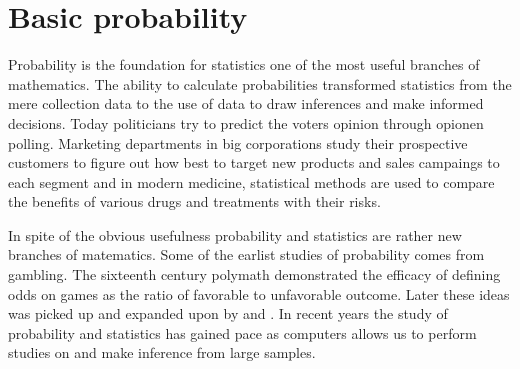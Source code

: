 \chapter{Basic probability}

Probability is the foundation for statistics one of the most useful branches of mathematics. The ability to calculate probabilities transformed statistics from the mere collection data to the use of data to draw inferences and make informed decisions. Today politicians try to predict the voters opinion through opionen polling. Marketing departments in big corporations study their prospective customers to figure out how best to target new products and sales campaings to each segment and in modern medicine, statistical methods are used to compare the benefits of various drugs and treatments with their risks.

\myindent In spite of the obvious usefulness probability and statistics are rather new branches of matematics. Some of the earlist studies of probability comes from gambling. The sixteenth century polymath  demonstrated the efficacy of defining odds on games as the ratio of favorable to unfavorable outcome. Later these ideas was picked up and expanded upon by  and . In recent years the study of probability and statistics has gained pace as computers allows us to perform studies on and make inference from large samples.

